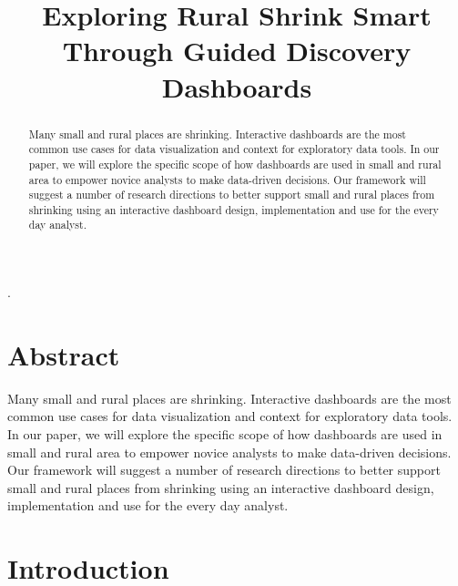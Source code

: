 \documentclass[letterpaper,inpress]{jdsart}
\begin{document}
\begin{frontmatter}

\title{Exploring Rural Shrink Smart Through Guided Discovery Dashboards}


\author[1]{
      }
\author[1]{
    }

\address[1]{Department of Statistics, 
  , }

\begin{abstract}
Many small and rural places are shrinking. Interactive dashboards are the most common use cases for data visualization and context for exploratory data tools. In our paper, we will explore the specific scope of how dashboards are used in small and rural area to empower novice analysts to make data-driven decisions. Our framework will suggest a number of research directions to better support small and rural places from shrinking using an interactive dashboard design, implementation and use for the every day analyst.
\end{abstract}

\begin{keywords}
.
\end{keywords}

\end{frontmatter}

\hypertarget{abstract}{%
\section{Abstract}\label{abstract}}

Many small and rural places are shrinking. Interactive dashboards are the most common use cases for data visualization and context for exploratory data tools. In our paper, we will explore the specific scope of how dashboards are used in small and rural area to empower novice analysts to make data-driven decisions. Our framework will suggest a number of research directions to better support small and rural places from shrinking using an interactive dashboard design, implementation and use for the every day analyst.

\hypertarget{introduction}{%
\section{Introduction}\label{introduction}}
\end{document}
